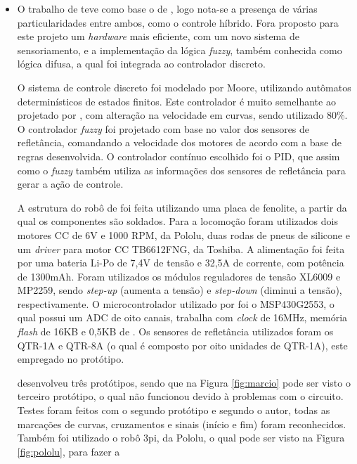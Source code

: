 \begin{itemize}
\item O trabalho de  teve como base o de , logo nota-se a presença de várias 
particularidades entre ambos, como o controle híbrido. Fora proposto para este projeto um \textit{hardware} mais 
eficiente, com um novo sistema de sensoriamento, e a implementação da lógica \textit{fuzzy}, também conhecida como 
lógica difusa, a qual foi integrada ao controlador discreto.\par %
O sistema de controle discreto foi modelado por Moore, utilizando autômatos determinísticos 
de estados finitos. Este controlador é muito semelhante ao projetado por , com alteração na velocidade em 
curvas, sendo utilizado 80\%. O controlador \textit{fuzzy} foi projetado com base no valor 
dos sensores de refletância, comandando a velocidade dos motores de acordo com a base de regras desenvolvida. O controlador 
contínuo escolhido foi o PID, que assim como o \textit{fuzzy} também utiliza as informações dos sensores de refletância para gerar a 
ação de controle.\par
%
A estrutura do robô de  foi feita utilizando uma placa de fenolite, a partir da qual os componentes são 
soldados. Para a locomoção foram utilizados dois motores CC de 6V e 1000 RPM, da Pololu, duas rodas de pneus de silicone e um 
\textit{driver} para motor CC TB6612FNG, da Toshiba. A alimentação foi feita por uma bateria Li-Po de 7,4V de tensão e 32,5A 
de corrente, com potência de 1300mAh. 
Foram utilizados os módulos reguladores de tensão XL6009 e MP2259, 
sendo \textit{step-up} (aumenta a tensão) e \textit{step-down} (diminui a tensão), respectivamente. O microcontrolador utilizado 
por  foi o MSP430G2553, o qual possui um ADC de oito canais, 
trabalha com \textit{clock} de 16MHz, memória \textit{flash} de 16KB e 0,5KB de 
. 
Os sensores de refletância utilizados foram os QTR-1A e QTR-8A (o qual é composto por oito unidades de QTR-1A), este empregado no 
protótipo.\par
%
 desenvolveu três protótipos, sendo que na Figura \ref{fig:marcio} pode ser visto o terceiro protótipo, o qual 
não funcionou devido à problemas com o circuito. Testes foram feitos com o segundo protótipo e 
segundo o autor, todas as marcações de curvas, cruzamentos e sinais (início e fim) foram reconhecidos. 
Também foi utilizado o robô 3pi, da Pololu, o qual pode ser visto na Figura \ref{fig:pololu}, para fazer a 

\end{itemize}
